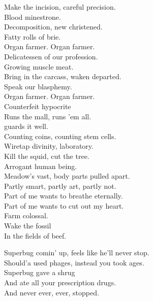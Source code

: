 Make the incision, careful precision. \\
Blood minestrone. \\
Decomposition, new  christened. \\
Fatty rolls of brie. \\

Organ farmer. Organ farmer. \\

Delicatessen of our profession. \\
Growing muscle meat. \\
Bring in the carcass, waken departed. \\
Speak our blasphemy. \\

Organ farmer. Organ farmer. \\

Counterfeit hypocrite \\
Runs the mall, runs 'em all. \\
 guards it well. \\
Counting coins, counting stem cells. \\
Wiretap divinity,  laboratory. \\

Kill the squid, cut the tree. \\
Arrogant human being. \\
Meadow's vast, body parts pulled apart. \\
Partly smart, partly art, partly not. \\
Part of me wants to breathe eternally. \\
Part of me wants to cut out my heart. \\

Farm colossal. \\
Wake the fossil \\
In the fields of beef. \\





Superbug comin' up, feels like he'll never stop. \\
Should'a used phages, instead you took ages. \\
Superbug gave a shrug \\
And ate all your prescription drugs. \\
And never ever, ever, stopped. \\

